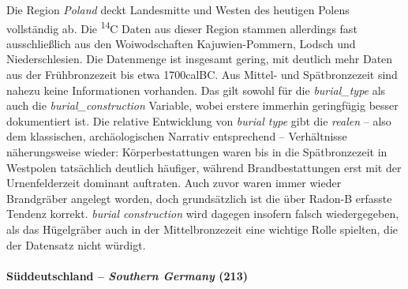 \documentclass[openany,twoside,twocolumn]{book}
\begin{document}
Die Region \emph{Poland} deckt Landesmitte und Westen des heutigen
Polens vollständig ab. Die \textsuperscript{14}C Daten aus dieser Region
stammen allerdings fast ausschließlich aus den Woiwodschaften
Kajuwien-Pommern, Lodsch und Niederschlesien. Die Datenmenge ist
insgesamt gering, mit deutlich mehr Daten aus der Frühbronzezeit bis
etwa 1700calBC. Aus Mittel- und Spätbronzezeit sind nahezu keine
Informationen vorhanden. Das gilt sowohl für die \emph{burial\_type} als
auch die \emph{burial\_construction} Variable, wobei erstere immerhin
geringfügig besser dokumentiert ist. Die relative Entwicklung von
\emph{burial type} gibt die \emph{realen} -- also dem klassischen,
archäologischen Narrativ entsprechend -- Verhältnisse näherungsweise
wieder: Körperbestattungen waren bis in die Spätbronzezeit in Westpolen
tatsächlich deutlich häufiger, während Brandbestattungen erst mit der
Urnenfelderzeit dominant auftraten. Auch zuvor waren immer wieder
Brandgräber angelegt worden, doch grundsätzlich ist die über Radon-B
erfasste Tendenz korrekt. \emph{burial construction} wird dagegen
insofern falsch wiedergegeben, als das Hügelgräber auch in der
Mittelbronzezeit eine wichtige Rolle spielten, die der Datensatz nicht
würdigt.

\hypertarget{suddeutschland-southern-germany-213}{%
\paragraph{\texorpdfstring{Süddeutschland -- \emph{Southern Germany}
(213)}{Süddeutschland -- Southern Germany (213)}}\label{suddeutschland-southern-germany-213}}
\end{document}
